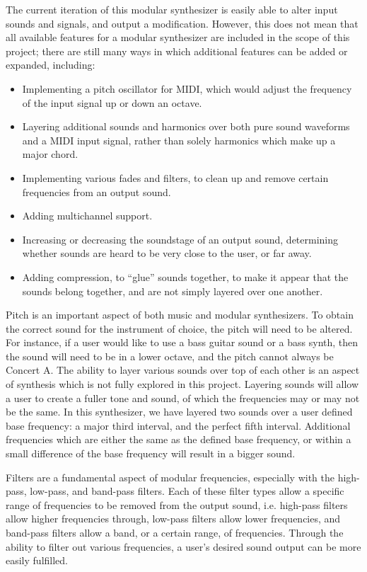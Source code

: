 The current iteration of this modular synthesizer is easily able to alter input sounds and signals, and output a modification. However, this does not mean that all available features for a modular synthesizer are included in the scope of this project; there are still many ways in which additional features can be added or expanded, including:

\begin{itemize}
	\item Implementing a pitch oscillator for MIDI, which would adjust the frequency of the input signal up or down an octave.
	\item Layering additional sounds and harmonics over both pure sound waveforms and a MIDI input signal, rather than solely harmonics which make up a major chord.
	\item Implementing various fades and filters, to clean up and remove certain frequencies from an output sound.
	\item Adding multichannel support. 
	\item Increasing or decreasing the soundstage of an output sound, determining whether sounds are heard to be very close to the user, or far away.
	\item Adding compression, to ``glue'' sounds together, to make it appear that the sounds belong together, and are not simply layered over one another.
\end{itemize}

Pitch is an important aspect of both music and modular synthesizers. To obtain the correct sound for the instrument of choice, the pitch will need to be altered. For instance, if a user would like to use a bass guitar sound or a bass synth, then the sound will need to be in a lower octave, and the pitch cannot always be Concert A. The ability to layer various sounds over top of each other is an aspect of synthesis which is not fully explored in this project. Layering sounds will allow a user to create a fuller tone and sound, of which the frequencies may or may not be the same. In this synthesizer, we have layered two sounds over a user defined base frequency: a major third interval, and the perfect fifth interval. Additional frequencies which are either the same as the defined base frequency, or within a small difference of the base frequency will result in a bigger sound.

Filters are a fundamental aspect of modular frequencies, especially with the high-pass, low-pass, and band-pass filters. Each of these filter types allow a specific range of frequencies to be removed from the output sound, i.e. high-pass filters allow higher frequencies through, low-pass filters allow lower frequencies, and band-pass filters allow a band, or a certain range, of frequencies. Through the ability to filter out various frequencies, a user's desired sound output can be more easily fulfilled. 

